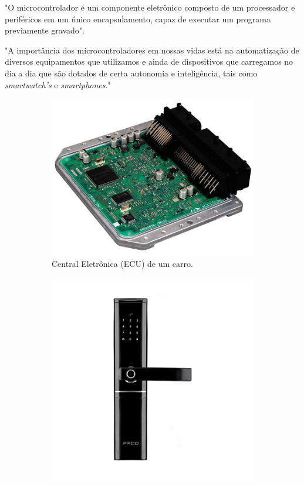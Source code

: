 \documentclass[12pt,a4paper]{report}
\begin{document}
"O microcontrolador é um componente eletrônico composto de um processador e periféricos em um único encapsulamento, capaz de executar um programa previamente gravado".

"A importância dos microcontroladores em nossas vidas está na automatização de diversos equipamentos que utilizamos e ainda de dispositivos que carregamos no dia a dia que são dotados de certa autonomia e inteligência, tais como \textit{smartwatch's} e \textit{smartphones}."

\begin{figure}[H]
    \centering
    \caption{Exemplos de aplicação de sistemas embarcados.}
    \begin{subfigure}{.4\textwidth}
      \centering
      \includegraphics[width=1\linewidth]{fig/ECU.png}
      \caption{Central Eletrônica (ECU) de um carro.}
      \label{fig:example_ECU}
    \end{subfigure}%
    \begin{subfigure}{.4\textwidth}
      \centering
      \includegraphics[width=1\linewidth]{fig/fd500.png}

\end{subfigure}
\end{figure}
\end{document}
